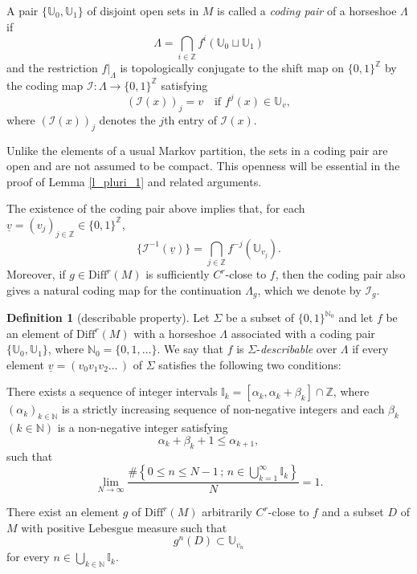 \documentclass{amsart}
\theoremstyle{definition}
\newtheorem{dfn}[thm]{Definition}
\numberwithin{equation}{section}
\numberwithin{figure}{section}
\def\setl{\setlength{\leftskip}{-18pt}}
\begin{document}
A pair $\{\mathbb{U}_0,\mathbb{U}_1\}$ of disjoint open sets in $M$ is
called a \emph{coding pair} of a horseshoe $\Lambda$ if 
\[
\Lambda =\bigcap_{i\in \mathbb{Z}} f^{i}(\mathbb U_0 \sqcup \mathbb U_1)
\]
and the restriction $f|_\Lambda$ is topologically conjugate 
to the shift map on $\{0,1\}^{\mathbb Z}$ by the coding map  
$\mathcal I: \Lambda  \longrightarrow  \{0,1\}^{\mathbb Z}$ satisfying
\[
\left(\mathcal I(x) \right)_j = v 
\quad \text{if } f^j(x) \in \mathbb U_{v},
\]
where $(\mathcal I(x) )_j$ denotes the $j$th entry of $\mathcal I(x)$. 

Unlike the elements of a usual Markov partition, the sets in a coding pair are open and are not assumed to be compact. 
This openness will be essential in the proof of Lemma \ref{l_pluri_1} and related arguments.

The existence of the coding pair above implies that, for each 
$\underline v=(v_j)_{j\in \mathbb Z}\in\{0,1\}^{\mathbb Z}$, 
\[
\{ \mathcal I^{-1}(\underline v)\}=
\bigcap _{j\in \mathbb Z} f^{-j}(\mathbb U_{v_j}).
\]
Moreover, if $g\in \mathrm{Diff}^r(M)$ is sufficiently $C^r$-close to $f$, then the coding pair also gives a natural coding map for the continuation $\Lambda_g$, which we denote by $\mathcal I_g$.

\begin{dfn}[describable property]\label{describable}
Let $\Sigma$ be a subset of $\{0,1\}^{\mathbb N_0}$ and 
let $f$ be an element of $\mathrm{Diff}^{r}(M)$ with a horseshoe $\Lambda$ associated with a coding pair $\{\mathbb U_0,\mathbb U_1\}$, 
where $\mathbb N_0=\{0,1,\ldots\}$.  
We say that $f$ is $\Sigma$-\emph{describable} over $\Lambda$  
if every element $\underline{v}=(v_{0}v_{1}v_{2}\ldots\,)$ of $\Sigma$
satisfies the following two conditions:
\begin{description}
\setl
\item[(DEI) \rm(Dominance of Encoded Intervals)]
There exists a sequence of integer intervals
$
\mathbb{I}_k=[\alpha_k, \alpha_k+\beta_k]\cap \mathbb Z
$,
where $(\alpha_k)_{k\in\mathbb N}$ is a strictly increasing sequence of non-negative integers and each $\beta_k$ $(k\in\mathbb N)$ is a non-negative integer satisfying
\[
\alpha_k+\beta_k+1\leq \alpha_{k+1},
\]
such that
\[
\lim_{N\rightarrow\infty}
\frac{
\#\left\{0\leq n\leq N-1\,;\,
n\in \bigcup_{k=1}^{\infty}\mathbb I_k
\right\}
}{N}
=1.
\]
\item[(OCD) \rm(Observable Coded Description)]
There exist an element $g$ of $\mathrm{Diff}^{r}(M)$ arbitrarily $C^r$-close to $f$ and a subset $D$ of $M$ with positive Lebesgue measure such that  
\[
g^n(D)\subset \mathbb U_{v_n}
\]
for every
$
n\in \bigcup_{k\in\mathbb N}\mathbb I_k.
$
\end{description}
\end{dfn}
\end{document}
